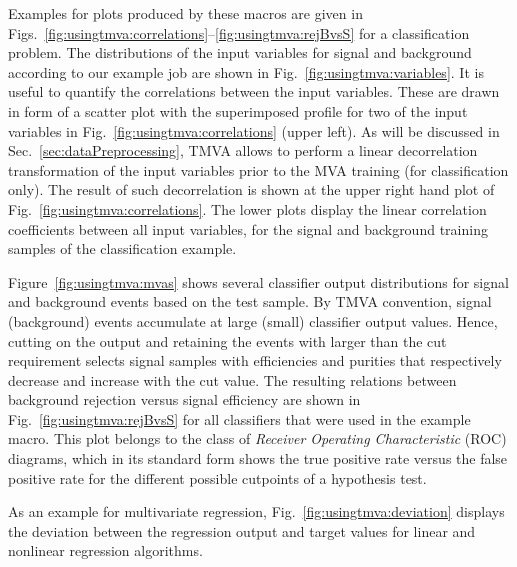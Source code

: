 Examples for plots produced by these macros are given in 
Figs.~\ref{fig:usingtmva:correlations}--\ref{fig:usingtmva:rejBvsS} for a 
classification problem.
The distributions of the input variables for signal and background 
according to our example job are shown in Fig.~\ref{fig:usingtmva:variables}. 
It is useful to quantify the correlations between the input variables.
These are drawn in form of a scatter plot with the superimposed profile for
two of the input variables in Fig.~\ref{fig:usingtmva:correlations} (upper left).  
As will be discussed in Sec.~\ref{sec:dataPreprocessing}, TMVA allows to perform 
a linear decorrelation transformation of the input variables prior to the MVA
training (for classification only). The result of such decorrelation is shown 
at the upper right hand plot of Fig.~\ref{fig:usingtmva:correlations}. The lower 
plots display the linear correlation coefficients between all input variables, 
for the signal and background training samples of the classification example.

Figure~\ref{fig:usingtmva:mvas} shows several classifier output 
distributions for signal and background events based on the test sample. 
By TMVA convention, signal (background) events accumulate at large 
(small) classifier output values. Hence, cutting on the output and retaining
the events with \yMVA larger than the cut requirement selects signal samples
with efficiencies and purities that respectively decrease and increase with 
the cut value. The resulting relations between background rejection versus 
signal efficiency are shown in Fig.~\ref{fig:usingtmva:rejBvsS} for all 
classifiers that were used in the example macro. This plot belongs to the 
class of {\em Receiver Operating Characteristic} (ROC) diagrams,
which in its standard form shows the true positive rate versus the false 
positive rate for the different possible cutpoints of a hypothesis test.

As an example for multivariate regression, Fig.~\ref{fig:usingtmva:deviation} displays
the deviation between the regression output and target values for linear and 
nonlinear regression algorithms. 

